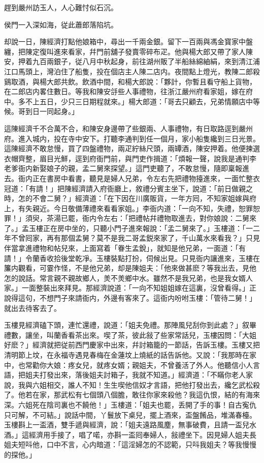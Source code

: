 趕到嚴州訪玉人，人心難忖似石沉。

侯門一入深如海，従此蕭郎落陷坑。

却說一日，陳經濟打點他娘箱中，尋出一千兩金銀。留下一百兩與馮金寳家中盤纏，把陳定復叫進來看家，幷門前舖子發賣零碎布疋。他與楊大郎又帶了家人陳安，押着九百兩銀子，従八月中秋起身，前往湖州販了半船絲綿紬絹，來到清江浦江口馬頭上，灣泊住了船隻，投在個店主人陳二店内。夜間點上燈光，教陳二郎殺鷄取酒，與楊大郎共飲。飲酒中間，和楊大郎說：「夥計，你暫且看守船上貨物，在二郎店内畧住數日。等我和陳安㧱些人事禮物，往浙江嚴州府看家姐，嫁在府中。多不上五日，少只三日期程就來。」楊大郎道：「哥去只顧去，兄弟情願店中等候。哥到日一同起身。」

這陳經濟千不合萬不合，和陳安身邊帶了些銀兩、人事禮物，有日取路逕到嚴州府。進入城内，投在寺中安下。打聽李通判到任一個月，家小船隻纔到三日光景。這陳經濟不敢怠慢，買了四盤禮物，兩疋紵絲尺頭，兩罈酒，陳安押着。他便揀選衣帽齊整，眉目光鮮，逕到府衙門前，與門吏作揖道：「煩報一聲，說我是通判李老爹衙内新娶娘子的親，孟二舅來探望。」這門吏聽了，不敢怠慢，隨即稟報進去。衙内正在書房中看書，聽見是婦人兄弟，令左右先把禮物擡進來，一面忙整衣冠道：「有請！」把陳經濟請入府衙廳上，敘禮分賓主坐下，說道：「前日做親之時，怎的不會二舅？」經濟道：「在下因在川廣販貨，一年方囘，不知家姐嫁與府上，有失親近。今日敬備薄禮來看看家姐。」李衙内道：「一向不知，失禮，恕罪恕罪！」須臾，茶湯已罷，衙内令左右：「把禮帖幷禮物取進去，對你娘說：二舅來了。」孟玉樓正在房中坐的，只聽小門子進來報說：「孟二舅來了。」玉樓道：「一二年不曾囘家，再有那個孟舅？莫不是我二哥孟鋭來家了，千山萬水來看我？」只見伴當拿進禮物和帖兒來，上面寫着「眷生孟銳」，就知是他兄弟，一面道：「有請！」令蘭香收拾後堂乾凈。玉樓裝點打扮，伺候出見。只見衙内讓進來，玉樓在簾内觀看，可霎作怪，不是他兄弟，却是陳姐夫：「他來做甚麽？等我出去，見他怎的說話。常言親不親故鄉人，羙不羙鄉中水。雖然不是我兄弟，也是我女婿人家。」一面整裝出來拜見。那經濟說道：「一向不知姐姐嫁在這裏，沒曾看得。」正說得這句，不想門子來請衙内，外邊有客來了。這衙内吩咐玉樓：「管待二舅！」就出去待客去了。

玉樓見經濟磕下頭，連忙還禮，說道：「姐夫免禮。那陣風兒刮你到此處？」叙畢禮數，讓坐，叫蘭香看茶出來。喫了茶，彼此敍了些家常話兒，玉樓因問：「大姐好麽？」經濟就把従前西門慶家中出來，幷討箱籠的一節話，告訴玉樓。玉樓又把清明節上坟，在永福寺遇見春梅在金蓮坟上燒紙的話告訴他。又說：「我那時在家中，也常勸你大娘：疼女兒，就疼女婿；親姐夫，不曾養活了外人。他聽信小人言語，把姐夫打發出來，落後姐夫討箱子，我就不知道。」經濟道：「不瞞你老人家說，我與六姐相交，誰人不知！生生喫他信奴才言語，把他打發出去，纔乞武松殺了。他若在家，那武松有七個頭八個膽，敢往你家來殺他？我這仇恨，結的有海來深。六姐死在陰司裏也不饒他！」玉樓道：「姐夫也罷，丢開了手的事！自古寃仇只可解，不可結。」說話中間，丫鬟放下桌兒，擺上酒來，盃盤餚品，堆滿春檯。玉樓斟上一盃酒，雙手遞與經濟，說：「姐夫遠路風塵，無事破費，且請一盃兒水酒。」這經濟用手接了，唱了喏，亦斟一盃囘奉婦人，敍禮坐下。因見婦人姐夫長姐夫短呌他，口中不言，心内暗道：「這淫婦怎的不認範，只呌我姐夫？等我慢慢的探他。」

